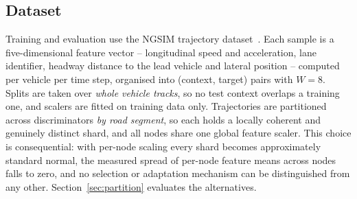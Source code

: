 \documentclass[journal]{IEEEtran}
\begin{document}
\subsection{Dataset}
Training and evaluation use the NGSIM trajectory dataset~\cite{ngsim}. Each
sample is a five-dimensional feature vector -- longitudinal speed and
acceleration, lane identifier, headway distance to the lead vehicle and lateral
position -- computed per vehicle per time step, organised into (context,
target) pairs with $W=8$. Splits are taken over \emph{whole vehicle tracks}, so
no test context overlaps a training one, and scalers are fitted on training
data only. Trajectories are partitioned across discriminators \emph{by road
segment}, so each holds a locally coherent and genuinely distinct shard, and
all nodes share one global feature scaler. This choice is consequential: with
per-node scaling every shard becomes approximately standard normal, the
measured spread of per-node feature means across nodes falls to zero, and no
selection or adaptation mechanism can be distinguished from any other.
Section~\ref{sec:partition} evaluates the alternatives.
\end{document}
